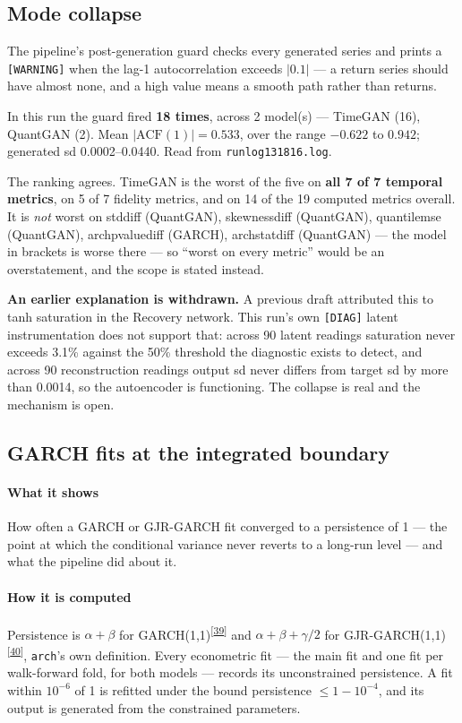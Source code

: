 \documentclass[11pt,a4paper]{article}
\makeatletter
\newcommand{\tcite}[1]{\textsuperscript{[\hyperlink{R:#1}{#1}]}}
\DeclareRobustCommand{\_}{\ifmmode\nfss@text{\textunderscore}\else\textunderscore\allowbreak\fi}
\makeatother
\begin{document}
\subsection{Mode collapse}
\label{sec:collapse}
The pipeline's post-generation guard checks every generated series and prints a \texttt{[WARNING]} when the lag-1 autocorrelation exceeds $|0.1|$ --- a return series should have almost none, and a high value means a smooth path rather than returns.

In this run the guard fired \textbf{18 times}, across 2 model(s) --- TimeGAN (16), QuantGAN (2). Mean \(|\text{ACF}(1)| = 0.533\), over the range \(-0.622\) to \(0.942\); generated sd 0.0002--0.0440. Read from \texttt{run\_log\_20260912\_131816.log}.

The ranking agrees. TimeGAN is the worst of the five on \textbf{all 7 of 7 temporal metrics}, on 5 of 7 fidelity metrics, and on 14 of the 19 computed metrics overall. It is \emph{not} worst on std\_diff (QuantGAN), skewness\_diff (QuantGAN), quantile\_mse (QuantGAN), arch\_pvalue\_diff (GARCH), arch\_stat\_diff (QuantGAN) --- the model in brackets is worse there --- so ``worst on every metric'' would be an overstatement, and the scope is stated instead.

\textbf{An earlier explanation is withdrawn.} A previous draft attributed this to tanh saturation in the Recovery network. This run's own \texttt{[DIAG]} latent instrumentation does not support that: across 90 latent readings saturation never exceeds 3.1\% against the 50\% threshold the diagnostic exists to detect, and across 90 reconstruction readings output sd never differs from target sd by more than 0.0014, so the autoencoder is functioning. The collapse is real and the mechanism is open.

\subsection{GARCH fits at the integrated boundary}
\label{sec:boundary}

\paragraph{What it shows} How often a GARCH or GJR-GARCH fit converged to a persistence of 1 --- the point at which the conditional variance never reverts to a long-run level --- and what the pipeline did about it.

\paragraph{How it is computed} Persistence is $\alpha+\beta$ for GARCH(1,1)\tcite{39} and $\alpha+\beta+\gamma/2$ for GJR-GARCH(1,1)\tcite{40}, \texttt{arch}'s own definition. Every econometric fit --- the main fit and one fit per walk-forward fold, for both models --- records its unconstrained persistence. A fit within $10^{-6}$ of 1 is refitted under the bound persistence $\le 1-10^{-4}$, and its output is generated from the constrained parameters.
\end{document}
